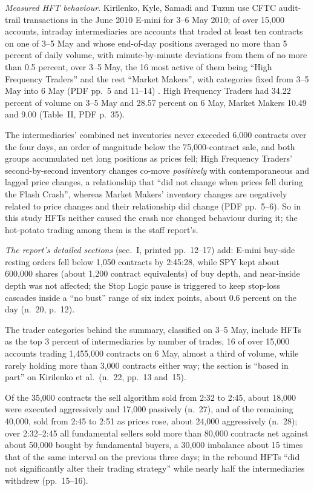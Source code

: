\begin{qfevidence}
\emph{Measured HFT behaviour}. Kirilenko, Kyle, Samadi and Tuzun use CFTC audit-trail transactions in the June 2010 E-mini for 3--6 May 2010; of over 15,000 accounts, intraday intermediaries are accounts that traded at least ten contracts on one of 3--5 May and whose end-of-day positions averaged no more than 5 percent of daily volume, with minute-by-minute deviations from them of no more than 0.5 percent, over 3--5 May, the 16 most active of them being ``High Frequency Traders'' and the rest ``Market Makers'', with categories fixed from 3--5 May into 6 May (PDF pp.~5 and 11--14) \citep[accepted manuscript]{w5-kirilenko-flash-crash}. High Frequency Traders had 34.22 percent of volume on 3--5 May and 28.57 percent on 6 May, Market Makers 10.49 and 9.00 (Table~II, PDF p.~35).

The intermediaries' combined net inventories never exceeded 6,000 contracts over the four days, an order of magnitude below the 75,000-contract sale, and both groups accumulated net long positions as prices fell; High Frequency Traders' second-by-second inventory changes co-move \emph{positively} with contemporaneous and lagged price changes, a relationship that ``did not change when prices fell during the Flash Crash'', whereas Market Makers' inventory changes are negatively related to price changes and their relationship did change (PDF pp.~5--6). So in this study HFTs neither caused the crash nor changed behaviour during it; the hot-potato trading among them is the staff report's.

\emph{The report's detailed sections} (sec.~I, printed pp.~12--17) add: E-mini buy-side resting orders fell below 1{,}050 contracts by 2:45:28, while SPY kept about 600{,}000 shares (about 1{,}200 contract equivalents) of buy depth, and near-inside depth was not affected; the Stop Logic pause is triggered to keep stop-loss cascades inside a ``no bust'' range of six index points, about 0.6 percent on the day (n.~20, p.~12).

The trader categories behind the summary, classified on 3--5 May, include HFTs as the top 3 percent of intermediaries by number of trades, 16 of over 15{,}000 accounts trading 1{,}455{,}000 contracts on 6 May, almost a third of volume, while rarely holding more than 3{,}000 contracts either way; the section is ``based in part'' on Kirilenko et al.\ (n.~22, pp.~13 and~15).

Of the 35{,}000 contracts the sell algorithm sold from 2:32 to 2:45, about 18{,}000 were executed aggressively and 17{,}000 passively (n.~27), and of the remaining 40{,}000, sold from 2:45 to 2:51 as prices rose, about 24{,}000 aggressively (n.~28); over 2:32--2:45 all fundamental sellers sold more than 80{,}000 contracts net against about 50{,}000 bought by fundamental buyers, a 30{,}000 imbalance about 15 times that of the same interval on the previous three days; in the rebound HFTs ``did not significantly alter their trading strategy'' while nearly half the intermediaries withdrew (pp.~15--16).


\end{qfevidence}
